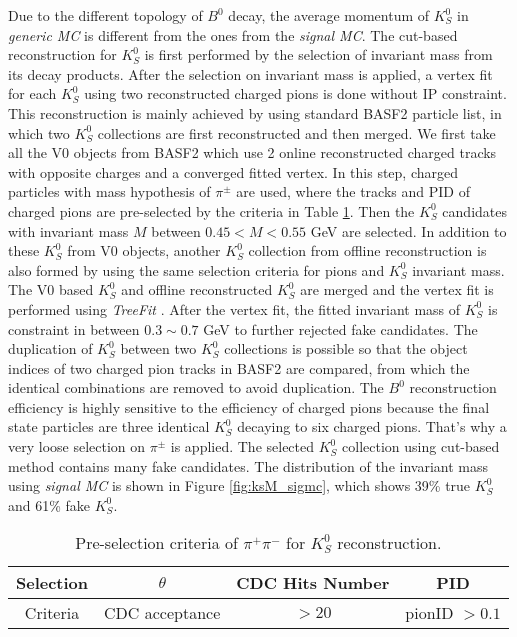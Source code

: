  Due to the different topology of $B^0$ decay, the average momentum of $K_S^0$ in \textit{generic MC} is different from the ones from the \textit{signal MC}. The cut-based reconstruction for $K_S^0$ is first performed by the selection of invariant mass from its decay products. After the selection on invariant mass is applied, a vertex fit for each $K_S^0$ using two reconstructed charged pions is done without IP constraint. This reconstruction is mainly achieved by using standard BASF2 particle list, in which two $K_S^0$ collections are first reconstructed and then merged. We first take all the V0 objects from BASF2 which use 2 online reconstructed charged tracks with opposite charges and a converged fitted vertex. In this step, charged particles with mass hypothesis of $\pi^{\pm}$ are used, where the tracks and PID of charged pions are pre-selected by the criteria in Table \ref{tab:kspipi_select}. Then the $K_S^0$ candidates with invariant mass $M$ between $0.45 < M < 0.55$ GeV are selected. In addition to these $K_S^0$ from V0 objects, another $K_S^0$ collection from offline reconstruction is also formed by using the same selection criteria for pions and $K_S^0$ invariant mass. The V0 based $K_S^0$ and offline reconstructed $K_S^0$ are merged and the vertex fit is performed using \textit{TreeFit} \cite{krohn2020global}. After the vertex fit, the fitted invariant mass of $K_S^0$ is constraint in between $0.3\sim 0.7$ GeV to further rejected fake candidates. The duplication of $K_S^0$ between two $K_S^0$ collections is possible so that the object indices of two charged pion tracks in BASF2 are compared, from which the identical combinations are removed to avoid duplication. The $B^0$ reconstruction efficiency is highly sensitive to the efficiency of charged pions because the final state particles are three identical $K_S^0$ decaying to six charged pions. That's why a very loose selection on $\pi^{\pm}$ is applied. The selected $K_S^0$ collection using cut-based method contains many fake candidates. The distribution of the invariant mass using \textit{signal MC} is shown in Figure \ref{fig:ksM_sigmc}, which shows 39\% true $K_S^0$ and 61\% fake $K_S^0$.
\begin{table}[htbp]
	\centering
	\large
	\caption{Pre-selection criteria of $\pi^+ \pi^-$ for $K_S^0$ reconstruction.}
	\label{tab:kspipi_select}
	\begin{tabular}{c c c c }
		\toprule
		Selection & $\theta$ & CDC Hits Number & PID  \\
		\hline
		Criteria  & CDC acceptance &  $>20$ & pionID $> 0.1$\\
		\bottomrule
	\end{tabular}
\end{table}

